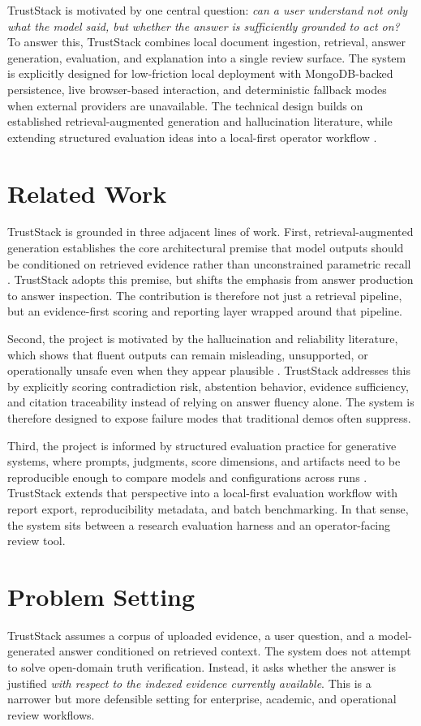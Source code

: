 \documentclass[conference]{IEEEtran}
\newcommand{\TrustSection}[1]{\section{\texorpdfstring{\textcolor{TrustStackBlue}{#1}}{#1}}}
\begin{document}
TrustStack is motivated by one central question: \emph{can a user understand not only what the model said, but whether the answer is sufficiently grounded to act on?} To answer this, TrustStack combines local document ingestion, retrieval, answer generation, evaluation, and explanation into a single review surface. The system is explicitly designed for low-friction local deployment with MongoDB-backed persistence, live browser-based interaction, and deterministic fallback modes when external providers are unavailable.
The technical design builds on established retrieval-augmented generation and hallucination literature, while extending structured evaluation ideas into a local-first operator workflow \cite{lewis2020rag,gao2023ragsurvey,ji2023survey,openai2024evals}.

\TrustSection{Related Work}
TrustStack is grounded in three adjacent lines of work. First, retrieval-augmented generation establishes the core architectural premise that model outputs should be conditioned on retrieved evidence rather than unconstrained parametric recall \cite{lewis2020rag,gao2023ragsurvey}. TrustStack adopts this premise, but shifts the emphasis from answer production to answer inspection. The contribution is therefore not just a retrieval pipeline, but an evidence-first scoring and reporting layer wrapped around that pipeline.

Second, the project is motivated by the hallucination and reliability literature, which shows that fluent outputs can remain misleading, unsupported, or operationally unsafe even when they appear plausible \cite{ji2023survey}. TrustStack addresses this by explicitly scoring contradiction risk, abstention behavior, evidence sufficiency, and citation traceability instead of relying on answer fluency alone. The system is therefore designed to expose failure modes that traditional demos often suppress.

Third, the project is informed by structured evaluation practice for generative systems, where prompts, judgments, score dimensions, and artifacts need to be reproducible enough to compare models and configurations across runs \cite{openai2024evals}. TrustStack extends that perspective into a local-first evaluation workflow with report export, reproducibility metadata, and batch benchmarking. In that sense, the system sits between a research evaluation harness and an operator-facing review tool.

\TrustSection{Problem Setting}
TrustStack assumes a corpus of uploaded evidence, a user question, and a model-generated answer conditioned on retrieved context. The system does not attempt to solve open-domain truth verification. Instead, it asks whether the answer is justified \emph{with respect to the indexed evidence currently available}. This is a narrower but more defensible setting for enterprise, academic, and operational review workflows.
\end{document}
